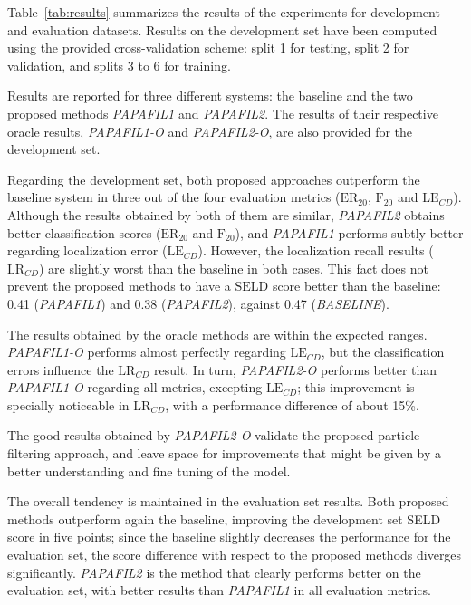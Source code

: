 Table~\ref{tab:results} summarizes the results of the experiments for development and evaluation datasets. Results on the development set have been computed using the provided cross-validation scheme: split 1 for testing, split 2 for validation, and splits 3 to 6 for training.

Results are reported for three different systems: the baseline and the two proposed methods \textit{PAPAFIL1} and \textit{PAPAFIL2}.
The results of their respective oracle results, \textit{PAPAFIL1-O} and \textit{PAPAFIL2-O}, are also provided for the development set. 

Regarding the development set, both proposed approaches outperform the baseline system in three out of the four evaluation metrics ($\text{ER}_{20}$, $\text{F}_{20}$ and $\text{LE}_{CD}$). 
Although the results obtained by both of them are similar, \textit{PAPAFIL2} obtains better classification scores ($\text{ER}_{20}$ and $\text{F}_{20}$), and \textit{PAPAFIL1} performs subtly better regarding localization error ($\text{LE}_{CD}$).
However, the localization recall results ($\text{LR}_{CD}$) are slightly worst than the baseline in both cases. This fact does not prevent the proposed methods to have a $\text{SELD}$ score better than the baseline: 0.41 (\textit{PAPAFIL1}) and 0.38 (\textit{PAPAFIL2}), against 0.47 (\textit{BASELINE}).

The results obtained by the oracle methods are within the expected ranges. \textit{PAPAFIL1-O} performs almost perfectly regarding $\text{LE}_{CD}$, but the classification errors influence the $\text{LR}_{CD}$ result.
In turn, \textit{PAPAFIL2-O} performs better than \textit{PAPAFIL1-O} regarding all metrics, excepting $\text{LE}_{CD}$; this improvement is specially noticeable in $\text{LR}_{CD}$, with a performance difference of about 15\%.

The good results obtained by \textit{PAPAFIL2-O} validate the proposed particle filtering approach, and leave space for improvements that might be given by a better understanding and fine tuning of the model.


The overall tendency is maintained in the evaluation set results. Both proposed methods outperform again the baseline, improving the development set SELD score in five points; since the baseline slightly decreases the performance for the evaluation set, the score difference with respect to the proposed methods diverges significantly.
\textit{PAPAFIL2} is the method that clearly performs better on the evaluation set, with better results than \textit{PAPAFIL1} in all evaluation metrics. \\
  



